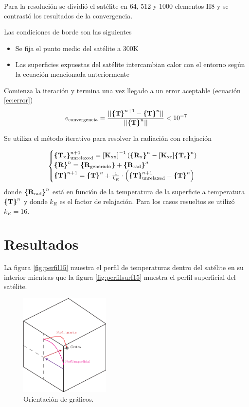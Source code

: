 \documentclass[onecolumn,10pt,titlepage,a4paper]{article}
\begin{document}
Para la resolución se dividió el satélite en 64, 512 y 1000 elementos H8 y se contrastó los resultados de la convergencia.

Las condiciones de borde son las siguientes
\begin{itemize}
	\item Se fija el punto medio del satélite a 300K
	\item Las superficies expuestas del satélite intercambian calor con el entorno según la ecuación mencionada anteriormente
\end{itemize}

Comienza la iteración  y termina una vez llegado a un error aceptable (ecuación \ref{ec:error})
\begin{equation}\label{ec:error}
	e_{\mathrm{convergencia}}=\frac{||\boldsymbol{\{ }\mathbf{T} \boldsymbol{\}}^{n+1}-\boldsymbol{\{ }\mathbf{T} \boldsymbol{\}}^{n}||}{||\boldsymbol{\{ }\mathbf{T} \boldsymbol{\}}^{n}||} < 10^{-7}
\end{equation}

Se utiliza el método iterativo para resolver la radiación con relajación

\begin{equation}
\begin{cases}
	\boldsymbol{\{ }\mathbf{T_{\mathrm{x}}} \boldsymbol{\}}^{n+1}_{\mathrm{unrelaxed}} =  \boldsymbol{[}\mathbf{K_{\mathrm{xx}}} \boldsymbol{]} ^{-1}  \left(\boldsymbol{\{ }\mathbf{R_{\mathrm{x}}} \boldsymbol{\}}^{n} - \boldsymbol{[}\mathbf{K_{\mathrm{xc}}} \boldsymbol{]} \boldsymbol{\{ }\mathbf{T_{\mathrm{c}}} \boldsymbol{\}}^{n}\right)\\
	\boldsymbol{\{ }\mathbf{R} \boldsymbol{\}}^{n} = \boldsymbol{\{ }\mathbf{R_{\mathrm{generado}}} \boldsymbol{\}}+ \boldsymbol{\{ }\mathbf{R_{\mathrm{rad}}} \boldsymbol{\}}^{n} \\
	\boldsymbol{\{ }\mathbf{T} \boldsymbol{\}}^{n+1} = \boldsymbol{\{ }\mathbf{T} \boldsymbol{\}}^n + \frac{1}{k_R} \cdot \left( \boldsymbol{\{ }\mathbf{T} \boldsymbol{\}}^{n+1}_{\mathrm{unrelaxed}} - \boldsymbol{\{ }\mathbf{T} \boldsymbol{\}}^{n} \right)
\end{cases}
\end{equation}
donde $\boldsymbol{\{ }\mathbf{R_{\mathrm{rad}}} \boldsymbol{\}}^{n}$ está en función de la temperatura de la superficie a temperatura $\boldsymbol{\{ }\mathbf{T} \boldsymbol{\}}^{n}$ y donde $k_R$ es el factor de relajación. Para los casos resueltos se utilizó $k_R=16$.

\section*{Resultados}
La figura \ref{fig:perfil15} muestra el perfil de temperaturas dentro del satélite en su interior mientras que la figura \ref{fig:perfilsurf15} muestra el perfil superficial del satélite. 
\begin{figure}[htb!]
	\centering
	\includegraphics[width=0.4\textwidth]{fig/modelo.eps}
	\caption{Orientación de gráficos.}
	\label{fig:modelo}
\end{figure}
\end{document}
